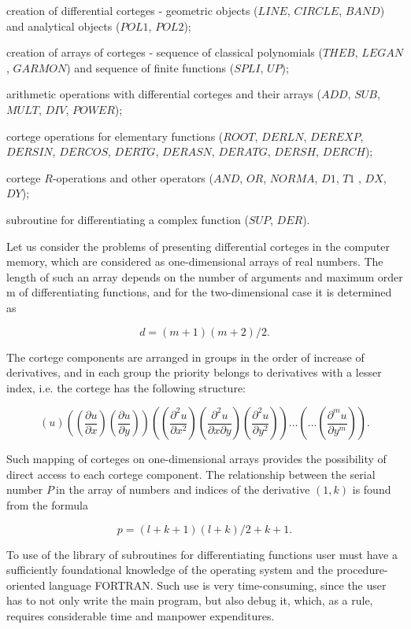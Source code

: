 creation of differential corteges - geometric objects ($LINE$, $CIRCLE$, $%
BAND$) and analytical objects ($POL1$, $POL2$);

creation of arrays of corteges - sequence of classical polynomials ($THEB$, $%
LEGAN$, $GARMON$) and sequence of finite functions ($SPLI$, $UP$);

arithmetic operations with differential corteges and their arrays ($ADD$, $%
SUB$, $MULT$, $DIV$, $POWER$);

cortege operations for elementary functions ($ROOT$, $DERLN$, $DEREXP$, $%
DERSIN$, $DERCOS$, $DERTG$, $DERASN$, $DERATG$, $DERSH$, $DERCH$);

cortege $R$-operations and other operators ($AND$, $OR$, $NORMA$, $D1$, $T1$%
, $DX$, $DY$);

subroutine for differentiating a complex function ($SUP$, $DER$).

Let us consider the problems of presenting differential corteges in the
computer memory, which are considered as one-dimensional arrays of real
numbers. The length of such an array depends on the number of arguments and
maximum order m of differentiating functions, and for the two-dimensional
case it is determined as

$$
d=(m+1)(m+2)/2. 
$$

The cortege components are arranged in groups in the order of increase of
derivatives, and in each group the priority belongs to derivatives with a
lesser index, i.e. the cortege has the following structure:

$$
\left( u\right) \left( \left( \frac{\partial u}{\partial x}\right) \left( 
\frac{\partial u}{\partial y}\right) \right) \left( \left( \frac{\partial
^2u }{\partial x^2}\right) \left( \frac{\partial ^2u}{\partial x\partial y}%
\right) \left( \frac{\partial ^2u}{\partial y^2}\right) \right) ...\left(
...\left( \frac{\partial ^mu}{\partial y^m}\right) \right) . 
$$

Such mapping of corteges on one-dimensional arrays provides the possibility
of direct access to each cortege component. The relationship between the
serial number $P\ $in the array of numbers and indices of the derivative $%
(1,k)$ is found from the formula

$$
p=\left( l+k+1\right) \left( l+k\right) /2+k+1. 
$$

To use of the library of subroutines for differentiating functions user must
have a sufficiently foundational knowledge of the operating system and the
procedure-oriented language FORTRAN. Such use is very time-consuming, since
the user has to not only write the main program, but also debug it, which,
as a rule, requires considerable time and manpower expenditures.

